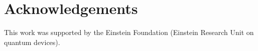 \section{Acknowledgements}\label{sec:acknowledgements}

This work was supported by the Einstein Foundation (Einstein Research Unit on quantum devices).